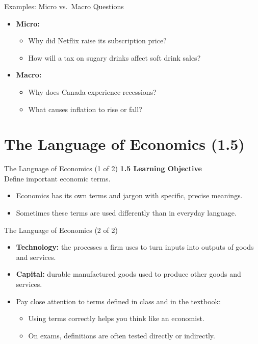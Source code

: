 \documentclass[aspectratio=169]{beamer}
\begin{document}
\begin{frame}{Examples: Micro vs.\ Macro Questions}
\transfade
\begin{itemize}[<+->]
  \item \textbf{Micro:}
  \begin{itemize}[<+->]
    \item Why did Netflix raise its subscription price?
    \item How will a tax on sugary drinks affect soft drink sales?
  \end{itemize}
  \item \textbf{Macro:}
  \begin{itemize}[<+->]
    \item Why does Canada experience recessions?
    \item What causes inflation to rise or fall?
  \end{itemize}
\end{itemize}
\end{frame}



\section{The Language of Economics (1.5)}

\begin{frame}{The Language of Economics (1 of 2)}
\transfade
\textbf{1.5 Learning Objective}\\[0.3em]
Define important economic terms.
\begin{itemize}[<+->]
  \item Economics has its own terms and jargon with specific, precise meanings.
  \item Sometimes these terms are used differently than in everyday language.
\end{itemize}
\end{frame}

\begin{frame}{The Language of Economics (2 of 2)}
\transfade
\begin{itemize}[<+->]
  \item \textbf{Technology:} the processes a firm uses to turn inputs into outputs of goods and services.
  \item \textbf{Capital:} durable manufactured goods used to produce other goods and services.
  \item Pay close attention to terms defined in class and in the textbook:
  \begin{itemize}[<+->]
    \item Using terms correctly helps you think like an economist.
    \item On exams, definitions are often tested directly or indirectly.
  \end{itemize}
\end{itemize}
\end{frame}
\end{document}
